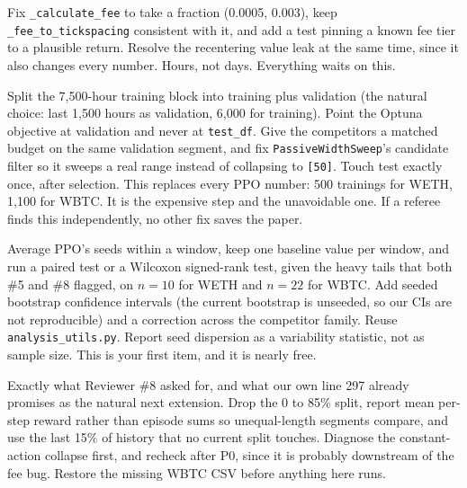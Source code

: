 \documentclass[11pt,a4paper]{article}
\newcommand{\code}[1]{\texttt{\small #1}}
\begin{document}
\begin{description}[leftmargin=2.6em,style=nextline,itemsep=5pt]

\item[P0. Settle the fee units.] Fix \code{\_calculate\_fee} to take a fraction (0.0005, 0.003),
keep \code{\_fee\_to\_tickspacing} consistent with it, and add a test pinning a known fee tier to a
plausible return. Resolve the recentering value leak at the same time, since it also changes every
number. Hours, not days. Everything waits on this.

\item[P1. Kill the tuning leak.] Split the 7{,}500-hour training block into training plus
validation (the natural choice: last 1{,}500 hours as validation, 6{,}000 for training). Point the
Optuna objective at validation and never at \code{test\_df}. Give the competitors a matched budget
on the same validation segment, and fix \code{PassiveWidthSweep}'s candidate filter so it sweeps a
real range instead of collapsing to \code{[50]}. Touch test exactly once, after selection. This
replaces every PPO number: 500 trainings for WETH, 1{,}100 for WBTC. It is the expensive step and
the unavoidable one. If a referee finds this independently, no other fix saves the paper.

\item[P2. Window-level paired statistics.] Average PPO's seeds within a window, keep one baseline
value per window, and run a paired test or a Wilcoxon signed-rank test, given the heavy tails that
both \#5 and \#8 flagged, on $n=10$ for WETH and $n=22$ for WBTC. Add seeded bootstrap confidence
intervals (the current bootstrap is unseeded, so our CIs are not reproducible) and a correction
across the competitor family. Reuse \code{analysis\_utils.py}. Report seed dispersion as a
variability statistic, not as sample size. This is your first item, and it is nearly free.

\item[P3. Rebuild transfer under the main protocol.] Exactly what Reviewer \#8 asked for, and what
our own line 297 already promises as the natural next extension. Drop the 0 to 85\% split, report
mean per-step reward rather than episode sums so unequal-length segments compare, and use the last
15\% of history that no current split touches. Diagnose the constant-action collapse first, and
recheck after P0, since it is probably downstream of the fee bug. Restore the missing WBTC CSV
before anything here runs.


\end{description}
\end{document}
